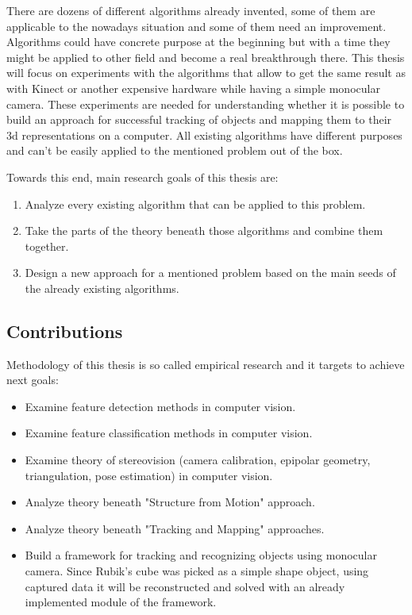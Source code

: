 \documentclass[../main]{subfiles}
\begin{document}
There are dozens of different algorithms already invented, some of them are applicable to the nowadays situation and some of them need an improvement. Algorithms could have concrete purpose at the beginning but with a time they might be applied to other field and become a real breakthrough there. This thesis will focus on experiments with the algorithms that allow to get the same result as with Kinect or another expensive hardware while having a simple monocular camera. These experiments are needed for understanding whether it is possible to build an approach for successful tracking of objects and mapping them to their 3d representations on a computer. All existing algorithms have different purposes and can't be easily applied to the mentioned problem out of the box.

Towards this end, main research goals of this thesis are:
\begin{enumerate}
\item  Analyze every existing algorithm that can be applied to this problem.
\item  Take the parts of the theory beneath those algorithms and combine them together.
\item  Design a new approach for a mentioned problem based on the main seeds of the already existing algorithms. 
\end{enumerate}

\subsection{Contributions}

Methodology of this thesis is so called empirical research and it targets to achieve next goals:

\begin{itemize}
  \item Examine feature detection methods in computer vision.
  \item Examine feature classification methods in computer vision.
  \item Examine theory of stereovision (camera calibration, epipolar geometry, triangulation, pose estimation) in computer vision.
  \item Analyze theory beneath "Structure from Motion" approach.
  \item Analyze theory beneath "Tracking and Mapping" approaches.
  \item Build a framework for tracking and recognizing objects using monocular camera. Since Rubik's cube was picked as a simple shape object, using captured data it will be reconstructed and solved with an already implemented module of the framework.
\end{itemize}
\end{document}
